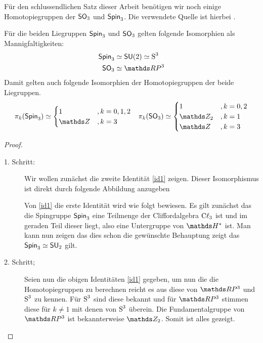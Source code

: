 Für den schlussendlichen Satz dieser Arbeit benötigen wir noch einige
Homotopiegruppen der $\so_3$ und $\spin_3$. Die verwendete Quelle ist
hierbei \cite{BHMMM15}.
\begin{Lem}\label{hgroups}
	Für die beiden Liegruppen $\spin_3$ und $\so_3$ gelten
	folgende Isomorphien als Mannigfaltigkeiten:
	\begin{align}
	\spin_3 &\simeq \su(2) \simeq \S^3 \label{{id1}}\\
	\so_3 &\simeq \RP^3 \label{id2}
	\end{align}
	Damit gelten auch folgende Isomorphien der Homotopiegruppen
	der beide Liegruppen.
	\begin{align*}
	\pi_k(\spin_3) &\simeq \begin{cases}
	1 & ,k=0,1,2 \\
	\Z & ,k=3
	\end{cases}
	&{\pi_k(\so_3) \simeq \begin{cases}
		1 & ,k=0,2 \\
		\Z_2 & ,k=1 \\
		\Z & ,k=3
		\end{cases}}
	\end{align*}
	
	\begin{proof}
		\begin{description}
                \item[1. Schritt:] Wir wollen zunächst die zweite
                  Identität \cref{id1} zeigen. Dieser Isomorphismus
                  ist direkt durch folgende Abbildung anzugeben
			
                  Von \cref{id1} die erste Identität wird wie folgt
                  bewiesen.  Es gilt zunächst das die Spingruppe
                  $ \spin_3 $ eine Teilmenge der Cliffordalgebra
                  $ \Cl_3 $ ist und im geraden Teil dieser liegt, also
                  eine Untergruppe von $ \H^\ast $ ist. Man kann nun
                  zeigen das dies schon die gewünschte Behauptung
                  zeigt das $ \spin_3 \simeq \su_2 $ gilt.
			
                \item[2. Schritt;] Seien nun die obigen Identitäten
                  \ref{id1}  gegeben, um nun die
                  die Homotopiegruppen zu berechnen reicht es aus
                  diese von $\RP^3$ und $ \S^3 $ zu kennen. Für
                  $ \S^3 $ sind diese bekannt und für $ \RP^3 $
                  stimmen diese für $ k \neq 1 $ mit denen von
                  $ \S^3 $ überein. Die Fundamentalgruppe von
                  $ \RP^3 $ ist bekannterweise $ \Z_2 $. Somit ist
                  alles gezeigt.
		\end{description}
		

\end{proof}
\end{Lem}
